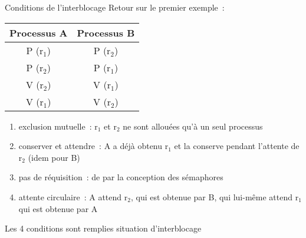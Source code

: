 \begin {frame} {Conditions de l'interblocage}
    Retour sur le premier exemple~:
    \begin {center}
	\footnotesize
	\begin {tabular} {c|c}
	    Processus A & Processus B \\
	    \hline
	    P (r$_1$) & P (r$_2$) \\
	    P (r$_2$) & P (r$_1$) \\
	    V (r$_2$) & V (r$_1$) \\
	    V (r$_1$) & V (r$_2$) \\
	\end {tabular}
    \end {center}

    \begin {enumerate}
	\item exclusion mutuelle~: r$_1$ et r$_2$ ne sont
	    allouées qu'à un seul processus

	\item conserver et attendre~: A a déjà obtenu r$_1$ et la
	    conserve pendant l'attente de r$_2$ (idem pour B)

	\item pas de réquisition~: de par la conception des sémaphores

	\item attente circulaire~: A attend r$_2$, qui est obtenue
	    par B, qui lui-même attend r$_1$ qui est obtenue par A

    \end {enumerate}

    Les 4 conditions sont remplies \implique situation d'interblocage
\end {frame}

